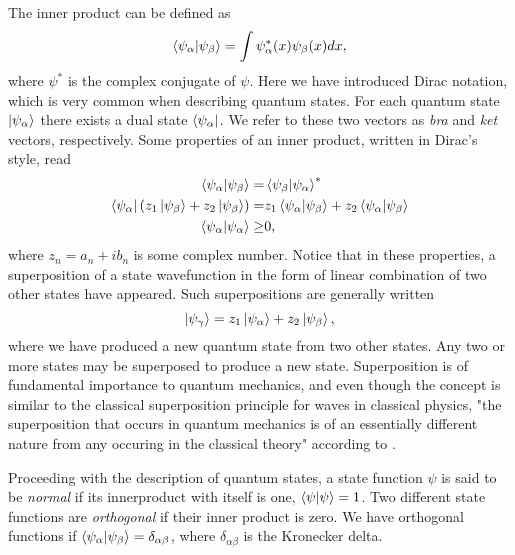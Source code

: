     The inner product can be defined as 
    \begin{equation}
        \braket{\psi_\alpha}{\psi_\beta} = \int \psi_\alpha^*(x) \psi_\beta(x)dx,
    \end{equation}
    where $\psi^*$ is the complex conjugate of $\psi$. Here we have introduced 
    Dirac notation, which is very common when describing quantum states. For each 
    quantum state $\ket{\psi_\alpha}$ there exists a dual state $\bra{\psi_\alpha}$.
    We refer to these two vectors as \emph{bra} and \emph{ket} vectors, respectively.
    Some properties of an inner product, written in Dirac's style, read
    \begin{align}
        \braket{\psi_\alpha}{\psi_\beta} =& \braket{\psi_\beta}{\psi_\alpha}^* \\
        \bra{\psi_\alpha}\left(z_1\ket{\psi_\beta} + z_2 \ket{\psi_\beta}\right)
            =& z_1 \braket{\psi_\alpha}{\psi_\beta} + z_2\braket{\psi_\alpha}{\psi_\beta} \\
        \braket{\psi_\alpha} \geq& 0,
    \end{align}
    where $z_n = a_n + ib_n$ is some complex number. Notice that in these properties, a 
    superposition of a state wavefunction in the form of linear combination of two other 
    states have appeared. Such superpositions are generally written
    \begin{equation}
        \label{eq:superposition}
        \ket{\psi_\gamma} = z_1\ket{\psi_\alpha} + z_2\ket{\psi_\beta},
    \end{equation}
    where we have produced a new quantum state from two other states. Any two or more
    states may be superposed to produce a new state. Superposition is of fundamental 
    importance to quantum mechanics, and even though the concept is similar to the 
    classical superposition principle for waves in classical physics, "the superposition 
    that occurs in quantum mechanics is of an essentially different nature from any 
    occuring in the classical theory" according 
    to \citeauthor{dirac1930principles}\cite{dirac1930principles}.

    Proceeding with the description of quantum states, a state function $\psi$ is said 
    to be \emph{normal} if its innerproduct with itself is one, $\braket{\psi}{\psi} = 1$.
    Two different state functions are \emph{orthogonal} if their inner product is zero. 
    We have orthogonal functions if $\braket{\psi_\alpha}{\psi_\beta} = \delta_{\alpha\beta}$,
    where $\delta_{\alpha\beta}$ is the Kronecker delta.


